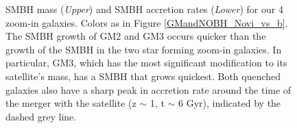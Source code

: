 \documentclass[]{emulateapj}
\begin{document}
\begin{figure}[h!]
\centerline{}
\centerline{}
\caption[]{SMBH mass (\textit{Upper}) and SMBH accretion rates (\textit{Lower}) for our 4 zoom-in galaxies. Colors as in Figure \ref{GMandNOBH_Novi_vs_b}. The SMBH growth of GM2 and GM3 occurs quicker than the growth of the SMBH in the two star forming zoom-in galaxies. In particular, GM3, which has the most significant modification to its satellite's mass, has a SMBH that grows quickest. Both quenched galaxies also have a sharp peak in accretion rate around the time of the merger with the satellite (z $\sim$ 1, t $\sim$ 6 Gyr), indicated by the dashed grey line.}
\label{BHinfo}
\end{figure}
\end{document}
